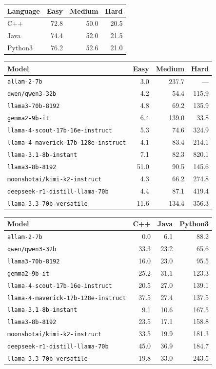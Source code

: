 \begin{tabular}{lrrr}
\hline\hline
\textbf{Language} & \textbf{Easy} & \textbf{Medium} & \textbf{Hard} \\
\hline
C++ & 72.8 & 50.0 & 20.5 \\
Java & 74.4 & 52.0 & 21.5 \\
Python3 & 76.2 & 52.6 & 21.0 \\
\hline\hline
\end{tabular}

\begin{tabular}{lrrr}
\hline\hline
\textbf{Model} & \textbf{Easy} & \textbf{Medium} & \textbf{Hard} \\
\hline
\texttt{allam-2-7b} & 3.0 & 237.7 & --- \\
\texttt{qwen/qwen3-32b} & 4.2 & 54.4 & 115.9 \\
\texttt{llama3-70b-8192} & 4.8 & 69.2 & 135.9 \\
\texttt{gemma2-9b-it} & 6.4 & 139.0 & 33.8 \\
\texttt{llama-4-scout-17b-16e-instruct} & 5.3 & 74.6 & 324.9 \\
\texttt{llama-4-maverick-17b-128e-instruct} & 4.1 & 83.4 & 214.1 \\
\texttt{llama-3.1-8b-instant} & 7.1 & 82.3 & 820.1 \\
\texttt{llama3-8b-8192} & 51.0 & 90.5 & 145.6 \\
\texttt{moonshotai/kimi-k2-instruct} & 4.3 & 66.2 & 274.8 \\
\texttt{deepseek-r1-distill-llama-70b} & 4.4 & 87.1 & 419.4 \\
\texttt{llama-3.3-70b-versatile} & 11.6 & 134.4 & 356.3 \\
\hline\hline
\end{tabular}

\begin{tabular}{lrrr}
\hline\hline
\textbf{Model} & \textbf{C++} & \textbf{Java} & \textbf{Python3} \\
\hline
\texttt{allam-2-7b} & 0.0 & 6.1 & 88.2 \\
\texttt{qwen/qwen3-32b} & 33.3 & 23.2 & 65.6 \\
\texttt{llama3-70b-8192} & 16.0 & 23.0 & 95.5 \\
\texttt{gemma2-9b-it} & 25.2 & 31.1 & 123.3 \\
\texttt{llama-4-scout-17b-16e-instruct} & 20.5 & 27.0 & 139.1 \\
\texttt{llama-4-maverick-17b-128e-instruct} & 37.5 & 27.4 & 137.5 \\
\texttt{llama-3.1-8b-instant} & 9.1 & 10.6 & 167.5 \\
\texttt{llama3-8b-8192} & 23.5 & 17.1 & 158.8 \\
\texttt{moonshotai/kimi-k2-instruct} & 33.5 & 19.9 & 181.3 \\
\texttt{deepseek-r1-distill-llama-70b} & 45.0 & 36.9 & 184.7 \\
\texttt{llama-3.3-70b-versatile} & 19.8 & 33.0 & 243.5 \\
\hline\hline
\end{tabular}

